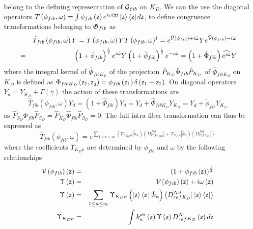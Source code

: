 belong to the defining representation of ${\cal G}_{fib}$ on $K_{D}$. We can
the use the diagonal operators $T\left( \phi _{fib},\omega \right) =\int
\phi _{fib}\left( {\sf z}\right) e^{i\omega \left( {\sf z}\right) }\left| 
{\sf z}\right\rangle \left\langle {\sf z}\right| d{\sf z}$, to define
congruence transformations belonging to ${\frak G}_{fib}$ as 
\begin{eqnarray}
&&\hat{T}_{fib}\left( \phi _{fib},\omega \right) Y=T\left( \phi
_{fib},\omega \right) YT\left( \phi _{fib},\omega \right) ^{\dagger }=e^{%
{\cal \breve{V}}\left( \phi _{fib}\right) +i\breve{\omega}}Ye^{{\cal \breve{V%
}}\left( \phi _{fib}\right) -i\breve{\omega}}  \nonumber \\
&=&\left( 1+\breve{\phi}_{fib}\right) ^{\frac{1}{2}}e^{i\breve{\omega}%
}Y\left( 1+\breve{\phi}_{fib}\right) ^{\frac{1}{2}}e^{-i\breve{\omega}%
}=\left( 1+\hat{\Phi}_{fib}\right) \widehat{e^{i\breve{\omega}}}Y
\end{eqnarray}%
where the integral kernel of $\hat{\Phi}_{fibK_{D}}$ of the projection $\hat{%
P}_{K_{D}}\hat{\Phi}_{fib}\hat{P}_{K_{D}}$ of $\hat{\Phi}_{fibK_{D}}$ on $%
K_{D}$ is defined as $\Phi _{fibK_{D}}\left( {\sf z}_{1}{\sf ,z}_{2}\right)
=\phi _{fib}\left( {\sf z}_{1}\right) \delta \left( {\sf z}_{1}-{\sf z}%
_{2}\right) $. On diagonal operators $Y_{d}=Y_{K_{D}}+\Gamma \left( \gamma
\right) $ the action of these transformations are 
\begin{equation}
\hat{T}_{fib}\left( \phi _{fib},\omega \right) Y_{d}=\left( 1+\hat{\Phi}%
_{fib}\right) Y_{d}=Y_{d}+\hat{\Phi}_{fibK_{D}}Y_{K_{D}}=Y_{d}+\breve{\phi}%
_{fib}Y_{K_{D}}
\end{equation}%
as $\hat{P}_{S_{D}}\hat{\Phi}_{fib}\hat{P}_{S_{D}}=\hat{P}_{K_{D}}\hat{\Phi}%
_{fib}\hat{P}_{S_{D}}=0$. The full intra fiber transformation can thus be
expressed as 
\begin{equation}
\hat{T}_{fib}\left( \phi _{fib},\omega \right) =e^{\sum_{1\leq \kappa \leq
\infty }\left\{ \Upsilon _{K_{OD}\kappa }\left| \breve{h}_{\kappa }\right)
\left( D_{refK_{OD}}^{Nd}\right| +\Upsilon _{K_{D}\kappa }\left| \breve{k}%
_{\kappa }\right) \left( D_{refK_{D}}^{Nd}\right| \right\} }  \label{parker}
\end{equation}%
where the coefficients $\Upsilon _{K_{D}\kappa }$ are determined by $\phi
_{fib}$ and $\omega $ by the following relationships%
\begin{eqnarray}
{\cal V}\left( \phi _{fib}\right) \left( {\sf z}\right) &=&\left( 1+\phi
_{fib}\left( {\sf z}\right) \right) ^{\frac{1}{2}}  \nonumber \\
\Upsilon \left( {\sf z}\right) &=&{\cal V}\left( \phi _{fib}\right) \left( 
{\sf z}\right) +i\omega \left( {\sf z}\right)  \nonumber \\
\Upsilon \left( {\sf z}\right) &=&\sum_{1\leq \kappa \leq \infty }\Upsilon
_{K_{D}\kappa }\left( \left| {\sf z}\right\rangle \left\langle {\sf z}%
\right| |\breve{k}_{\kappa }\right) \left( D_{refK_{D}}^{Nd}|\left| {\sf z}%
\right\rangle \left\langle {\sf z}\right| \right)  \nonumber \\
\Upsilon _{K_{D}\kappa } &=&\int k_{\kappa }^{d\ast }\left( {\sf z}\right)
\Upsilon \left( {\sf z}\right) D_{ref}^{N}{}_{K_{D}}\left( {\sf z}\right) d%
{\sf z}
\end{eqnarray}
